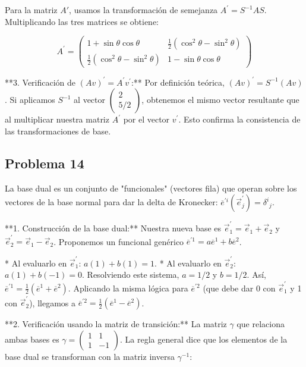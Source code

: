 \documentclass[11pt,spanish]{article}
\begin{document}
Para la matriz $A'$, usamos la transformación de semejanza $A^{\prime} = S^{-1}AS$. Multiplicando las tres matrices se obtiene:


$$A^{\prime} = \begin{pmatrix} 1 + \sin\theta\cos\theta & \frac{1}{2}(\cos^2\theta - \sin^2\theta) \\ \frac{1}{2}(\cos^2\theta - \sin^2\theta) & 1 - \sin\theta\cos\theta \end{pmatrix}$$

**3. Verificación de $(Av)^{\prime} = A^{\prime}v^{\prime}$:**
Por definición teórica, $(Av)^{\prime} = S^{-1}(Av)$. Si aplicamos $S^{-1}$ al vector $\begin{pmatrix} 2 \\ 5/2 \end{pmatrix}$, obtenemos el mismo vector resultante que al multiplicar nuestra matriz $A^{\prime}$ por el vector $v^{\prime}$. Esto confirma la consistencia de las transformaciones de base.


\subsection*{Problema 14}

La base dual es un conjunto de "funcionales" (vectores fila) que operan sobre los vectores de la base normal para dar la delta de Kronecker: $\overline{e}^{\prime i}(\vec{e}_{j}^{\prime})={\delta^{i}}_{j}$.

**1. Construcción de la base dual:**
Nuestra nueva base es $\vec{e}_{1}^{\prime}=\vec{e}_{1}+\vec{e}_{2}$ y $\vec{e}_{2}^{\prime}=\vec{e}_{1}-\vec{e}_{2}$.
Proponemos un funcional genérico $\overline{e}^{\prime 1} = a\overline{e}^1 + b\overline{e}^2$.

* Al evaluarlo en $\vec{e}_{1}^{\prime}$: $a(1) + b(1) = 1$.
* Al evaluarlo en $\vec{e}_{2}^{\prime}$: $a(1) + b(-1) = 0$.
Resolviendo este sistema, $a = 1/2$ y $b = 1/2$. Así, $\overline{e}^{\prime 1} = \frac{1}{2}(\overline{e}^1 + \overline{e}^2)$.
Aplicando la misma lógica para $\overline{e}^{\prime 2}$ (que debe dar 0 con $\vec{e}_{1}^{\prime}$ y 1 con $\vec{e}_{2}^{\prime}$), llegamos a $\overline{e}^{\prime 2} = \frac{1}{2}(\overline{e}^1 - \overline{e}^2)$.



**2. Verificación usando la matriz de transición:**
La matriz $\gamma$ que relaciona ambas bases es $\gamma = \begin{pmatrix} 1 & 1 \\ 1 & -1 \end{pmatrix}$.
La regla general dice que los elementos de la base dual se transforman con la matriz inversa $\gamma^{-1}$:
\end{document}
